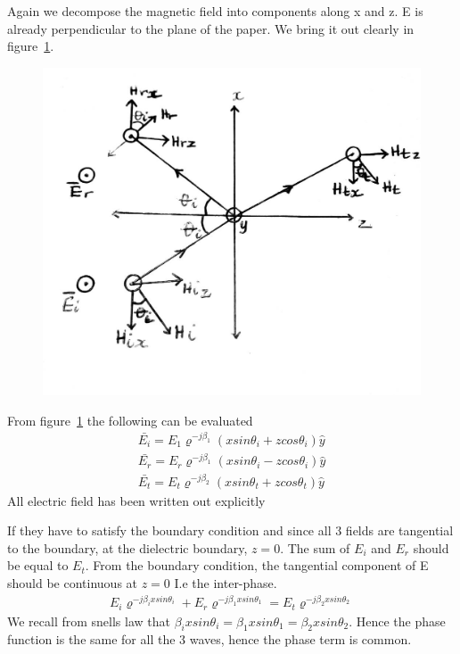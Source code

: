Again we decompose the magnetic field into components along x and z. E is already perpendicular to the plane of the paper. We bring it out clearly in figure~\ref{fig:14}.
\begin{figure}[h]
\centering
\includegraphics[width=1\linewidth]{./graphics/14}
\caption{}
\label{fig:14}
\end{figure}

From figure~\ref{fig:14} the following can be evaluated
\begin{align*}
\bar{E_{i}} = E_{1} \varrho^{-j\beta_{1}} (x sin\theta_{i} + z cos\theta_{i}) \hat{y}\\
\bar{E_{r}} = E_{r}  \varrho^{-j\beta_{1}} (x sin\theta_{i} - z cos\theta_{i}) \hat{y}\\
\bar{E_{t}} = E_{t} \varrho^{-j\beta_{2}} (x sin\theta_{t} + z cos\theta_{t}) \hat{y}
\end{align*}
All electric field has been written out explicitly 

If they have to satisfy the boundary condition and since all 3 fields are tangential to the boundary, at the dielectric boundary, $z=0$. The sum of $E_i$ and $E_r$ should be equal to $E_{t}$. From the boundary condition, the tangential component of E should be continuous at $z=0$ I.e the inter-phase.
\begin{align*}
E_{i} \varrho^{-j \beta_{i} x sin\theta_{i}} + E_{r} \varrho^{-j \beta_{1} x sin\theta_{1}} = E_{t} \varrho^{-j \beta_{2} x sin\theta_{2}}
\end{align*}
We recall from snells law that $\beta_{i} x sin\theta_{i} = \beta_{1} x sin\theta_{1} = \beta_{2} x sin\theta_{2}$. Hence the phase function is the same for all the 3 waves, hence the phase term is common.

